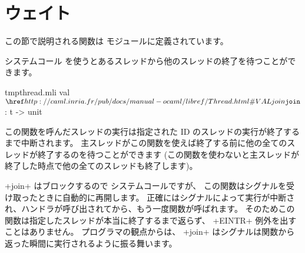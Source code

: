 \section{ウェイト}

この節で説明される関数は  モジュールに定義されています。

システムコール  を使うとあるスレッドから他のスレッドの終了を待つことができます。
%
\begin{listingcodefile}{tmpthread.mli}
val $\libvalue{Thread}{join}$ : t -> unit
\end{listingcodefile}
%
この関数を呼んだスレッドの実行は指定された ID のスレッドの実行が終了するまで中断されます。
主スレッドがこの関数を使えば終了する前に他の全てのスレッドが終了するのを待つことができます
(この関数を使わないと主スレッドが終了した時点で他の全てのスレッドも終了します)。

\ml+join+ はブロックするので  システムコールですが、
この関数はシグナルを受け取ったときに自動的に再開します。
正確にはシグナルによって実行が中断され、ハンドラが呼び出されてから、もう一度関数が呼ばれます。
そのためこの関数は指定したスレッドが本当に終了するまで返らず、
\ml+EINTR+ 例外を出すことはありません。
\ocaml プログラマの観点からは、
\ml+join+ はシグナルは関数から返った瞬間に実行されるように振る舞います。

